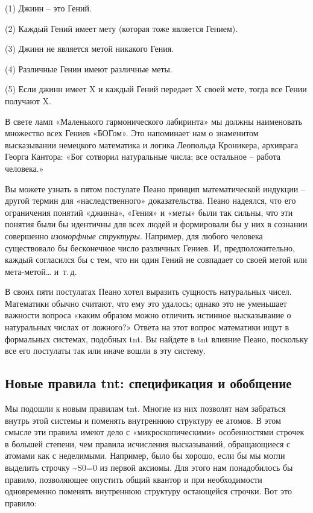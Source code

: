 \documentclass[../main.tex]{subfiles}
\begin{document}
(1) Джинн \--- это Гений.

(2) Каждый Гений имеет мету (которая тоже является Гением).

(3) Джинн не является метой никакого Гения.

(4) Различные Гении имеют различные меты.

(5) Если джинн имеет X и каждый Гений передает X своей мете, тогда все Гении получают X.

В свете ламп «Маленького гармонического лабиринта» мы должны наименовать множество всех Гениев «БОГом». Это напоминает нам о знаменитом высказывании немецкого математика и логика Леопольда Кроникера, архиврага Георга Кантора: «Бог сотворил натуральные числа; все остальное \--- работа человека.»

Вы можете узнать в пятом постулате Пеано принцип математической индукции \--- другой термин для «наследственного» доказательства. Пеано надеялся, что его ограничения понятий «джинна», «Гения» и «меты» были так сильны, что эти понятия были бы идентичны для всех людей и формировали бы у них в сознании совершенно \emph{изоморфные структуры}. Например, для любого человека существовало бы бесконечное число различных Гениев. И, предположительно, каждый согласился бы с тем, что ни один Гений не совпадает со своей метой или мета-метой\ldots{} и~т.\,д.

В своих пяти постулатах Пеано хотел выразить сущность натуральных чисел. Математики обычно считают, что ему это удалось; однако это не уменьшает важности вопроса «каким образом можно отличить истинное высказывание о натуральных числах от ложного?» Ответа на этот вопрос математики ищут в формальных системах, подобных \acs{tnt}. Вы найдете в \acs{tnt} влияние Пеано, поскольку все его постулаты так или иначе вошли в эту систему.


\subsection{Новые правила \acs{tnt}: спецификация и обобщение}

Мы подошли к новым правилам \acs{tnt}. Многие из них позволят нам забраться внутрь этой системы и поменять внутреннюю структуру ее атомов. В этом смысле эти правила имеют дело с «микроскопическими» особенностями строчек в большей степени, чем правила исчисления высказываний, обращающиеся с атомами как с неделимыми. Например, было бы хорошо, если бы мы могли выделить строчку \textasciitilde S0=0 из первой аксиомы. Для этого нам понадобилось бы правило, позволяющее опустить общий квантор и при необходимости одновременно поменять внутреннюю структуру остающейся строчки. Вот это правило:
\end{document}
